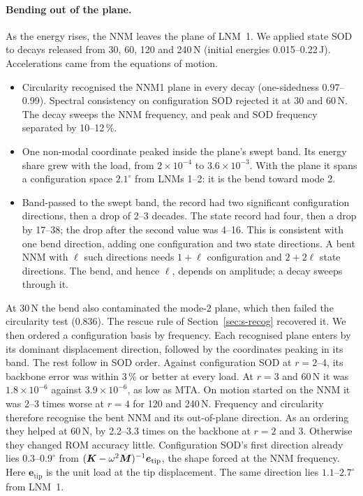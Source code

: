 \documentclass[11pt]{article}
\begin{document}
\paragraph{Bending out of the plane.} As the energy rises, the NNM leaves the plane of LNM~1. We applied state SOD to decays released from 30, 60, 120 and 240\,N (initial energies 0.015--0.22\,J). Accelerations came from the equations of motion.
\begin{itemize}
\item Circularity recognised the NNM1 plane in every decay (one-sidedness 0.97--0.99). Spectral consistency on configuration SOD rejected it at 30 and 60\,N. The decay sweeps the NNM frequency, and peak and SOD frequency separated by 10--12\,\%.
\item One non-modal coordinate peaked inside the plane's swept band. Its energy share grew with the load, from $2\times10^{-4}$ to $3.6\times10^{-3}$. With the plane it spans a configuration space $2.1^\circ$ from LNMs 1--2: it is the bend toward mode 2.
\item Band-passed to the swept band, the record had two significant configuration directions, then a drop of 2--3 decades. The state record had four, then a drop by 17--38; the drop after the second value was 4--16. This is consistent with one bend direction, adding one configuration and two state directions. A bent NNM with $\ell$ such directions needs $1+\ell$ configuration and $2+2\ell$ state directions. The bend, and hence $\ell$, depends on amplitude; a decay sweeps through it.
\end{itemize}
At 30\,N the bend also contaminated the mode-2 plane, which then failed the circularity test (0.836). The rescue rule of Section~\ref{sec:s-recog} recovered it.
We then ordered a configuration basis by frequency. Each recognised plane enters by its dominant displacement direction, followed by the coordinates peaking in its band. The rest follow in SOD order. Against configuration SOD at $r=2$--4, its backbone error was within 3\,\% or better at every load. At $r=3$ and 60\,N it was $1.8\times10^{-6}$ against $3.9\times10^{-6}$, as low as MTA. On motion started on the NNM it was 2--3 times worse at $r=4$ for 120 and 240\,N.
Frequency and circularity therefore recognise the bent NNM and its out-of-plane direction. As an ordering they helped at 60\,N, by 2.2--3.3 times on the backbone at $r=2$ and 3. Otherwise they changed ROM accuracy little. Configuration SOD's first direction already lies $0.3$--$0.9^\circ$ from $(\bm{K}-\omega^2\bm{M})^{-1}\bm{e}_{\mathrm{tip}}$, the shape forced at the NNM frequency. Here $\bm{e}_{\mathrm{tip}}$ is the unit load at the tip displacement. The same direction lies $1.1$--$2.7^\circ$ from LNM~1.
\end{document}
